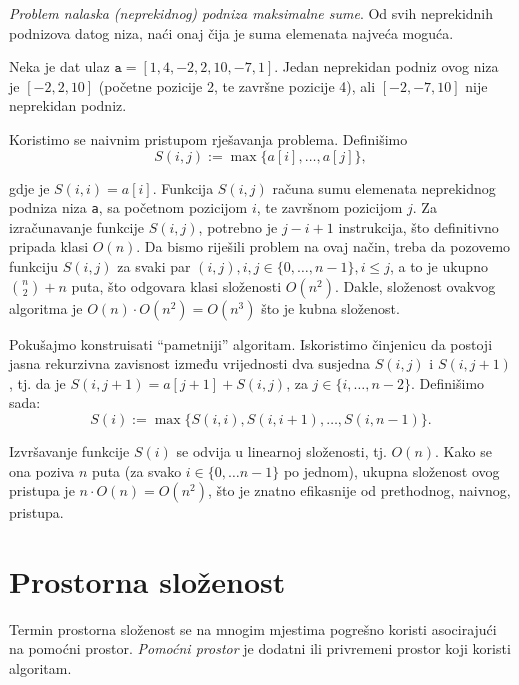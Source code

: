 \begin{example}
 \textit{{Problem nalaska (neprekidnog) podniza  maksimalne sume}}.  Od svih neprekidnih podnizova datog
 niza, naći onaj čija je suma elemenata najveća moguća. 
\end{example}
\begin{solution}
 
 Neka je dat ulaz $\texttt{a} = [1, 4, -2, 2, 10, -7, 1]$.  Jedan neprekidan podniz ovog niza je $[ -2, 2, 10 ]$ (početne pozicije 2, te završne pozicije 4), ali $[-2, -7, 10]$ nije neprekidan podniz. 
 
Koristimo se naivnim pristupom rješavanja problema. Definišimo $$S(i, j) := \max  \{ a[i], \ldots, a[j] \},$$

gdje je $S(i, i ) = a[i]$. 
Funkcija $S(i,j)$ računa sumu elemenata neprekidnog podniza niza \texttt{a}, sa početnom pozicijom  $i$, te završnom pozicijom $j$.
Za izračunavanje funkcije $S(i, j)$, potrebno je $j-i+1$ instrukcija, što definitivno pripada klasi $O(n)$. Da bismo riješili problem na ovaj način, 
treba da pozovemo funkciju $S(i,j)$ za svaki par $(i,j),  {i, j \in \{0, \ldots , n-1\},  i \leq j}$, a to je ukupno $\binom{n}{2} + n$ puta, što odgovara klasi složenosti $O(n^2)$. Dakle, složenost ovakvog algoritma je $O(n)\cdot O(n^2) = O(n^3)$ što je kubna složenost. 

Pokušajmo konstruisati ``pametniji'' algoritam. Iskoristimo činjenicu da postoji jasna rekurzivna zavisnost između vrijednosti dva susjedna $S(i,j)$ i $S(i, j+1)$, tj. da je $S(i, j+1) = a[j+1] + S(i, j)$, za $j \in \{i, \ldots, n-2\}$. Definišimo sada:
$$ S(i):= \max \{ S(i, i), S(i, i+1), \ldots, S(i, n-1)\}.$$

Izvršavanje funkcije $S(i)$ se odvija u linearnoj složenosti, tj. $O(n)$. Kako se ona poziva $n$ puta (za svako $i \in \{0, \ldots n-1\}$ po jednom), ukupna složenost ovog pristupa je $n \cdot O(n) = O(n^2)$, što je znatno efikasnije od prethodnog, naivnog, pristupa. 
 

\end{solution}



 
 
 \section{Prostorna složenost}
 
 
 Termin prostorna složenost se na mnogim mjestima pogrešno koristi asocirajući na pomoćni prostor.  \textit{Pomoćni prostor} je dodatni ili privremeni prostor koji koristi algoritam.
 
